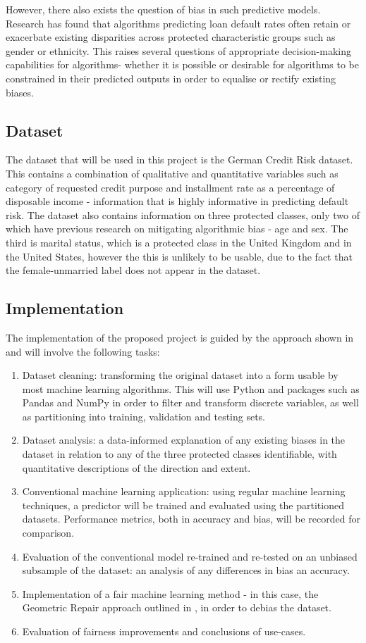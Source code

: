\documentclass[conference]{IEEEtran}
\begin{document}
However, there also exists the question of bias in such predictive models. Research has found that algorithms predicting loan default rates often retain or exacerbate existing disparities across protected characteristic groups such as gender or ethnicity\cite{bias}. This raises several questions of appropriate decision-making capabilities for algorithms- whether it is possible or desirable for algorithms to be constrained in their predicted outputs in order to equalise or rectify existing biases.
\subsection{Dataset}
The dataset that will be used in this project is the German Credit Risk dataset. This contains a combination of qualitative and quantitative variables such as category of requested credit purpose and installment rate as a percentage of disposable income - information that is highly informative in predicting default risk. The dataset also contains information on three protected classes, only two of which have previous research on mitigating algorithmic bias - age and sex. The third is marital status, which is a protected class in the United Kingdom and in the United States, however the this is unlikely to be usable, due to the fact that the female-unmarried label does not appear in the dataset.
\subsection{Implementation}
The implementation of the proposed project is guided by the approach shown in \cite{main} and will involve the following tasks:
\begin{enumerate}
    \item Dataset cleaning: transforming the original dataset into a form usable by most machine learning algorithms. This will use Python and packages such as Pandas and NumPy in order to filter and transform discrete variables, as well as partitioning into training, validation and testing sets.
    \item Dataset analysis: a data-informed explanation of any existing biases in the dataset in relation to any of the three protected classes identifiable, with quantitative descriptions of the direction and extent.
    \item Conventional machine learning application: using regular machine learning techniques, a predictor will be trained and evaluated using the partitioned datasets. Performance metrics, both in accuracy and bias, will be recorded for comparison.
    \item Evaluation of the conventional model re-trained and re-tested on an unbiased subsample of the dataset: an analysis of any differences in bias an accuracy.
    \item Implementation of a fair machine learning method - in this case, the Geometric Repair approach outlined in \cite{main}, in order to debias the dataset.
    \item Evaluation of fairness improvements and conclusions of use-cases.
\end{enumerate}
\end{document}
